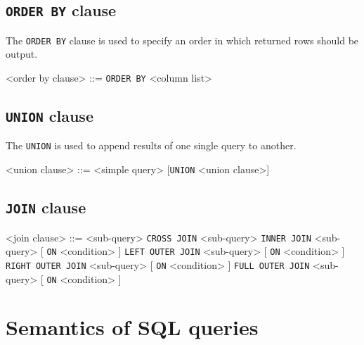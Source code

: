 \documentclass[magisterska,en]{pracamgr}
\newcommand{\code}[1]{\texttt{#1}}
\begin{document}
\subsection{\code{ORDER BY} clause}

The \code{ORDER BY} clause is used to specify an order in which returned rows should be output.

\begin{grammar}
<order by clause> ::= \code{ORDER BY} <column list>
\end{grammar}


\subsection{\code{UNION} clause}\label{union-syntax}

The \code{UNION} is used to append results of one single query to another.

\begin{grammar}
<union clause> ::= <simple query> [\code{UNION} <union clause>]
\end{grammar}

\subsection{\code{JOIN} clause}\label{join-syntax}

\begin{grammar}
    <join clause> ::= <sub-query> \code{CROSS JOIN} <sub-query>
     \code{INNER JOIN} <sub-query> [ \code{ON} <condition> ]
     \code{LEFT OUTER JOIN} <sub-query> [ \code{ON} <condition> ]
     \code{RIGHT OUTER JOIN} <sub-query> [ \code{ON} <condition> ]
     \code{FULL OUTER JOIN} <sub-query> [ \code{ON} <condition> ]
\end{grammar}



\section{Semantics of SQL queries}

\end{document}
